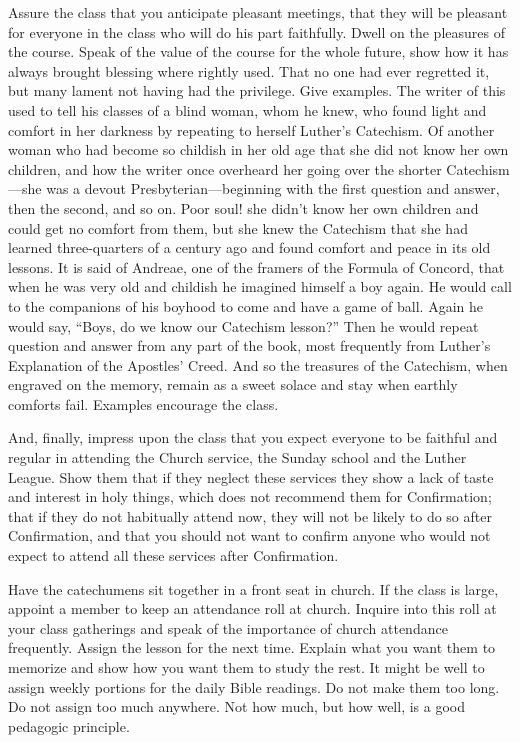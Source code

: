 Assure the class that you anticipate pleasant meetings, that they will be pleasant for everyone in the class who will do his part faithfully. Dwell on the
pleasures of the course. Speak of the value of the course for the whole future, show how it has always brought blessing where rightly used. That no one had ever regretted it, but many lament not having had the privilege. Give examples. The writer of this used to tell his classes of a blind woman, whom he knew, who found light and comfort in her darkness by repeating to herself Luther’s Catechism. Of another woman who had become so childish in her old age that she did not know her own children, and how the writer once overheard her going over the shorter Catechism—she was a devout Presbyterian—beginning with the first question and answer, then the second, and so on. Poor soul! she didn’t know her own children and could get no comfort from them, but she knew the Catechism that she had learned three-quarters of a century ago and found comfort and peace in its old lessons. It is said of Andreae, one of the framers of the Formula of Concord, that when he was very old and childish he imagined himself a boy again. He would call to the companions of his boyhood to come and have a game of ball. Again he would say, “Boys, do we know our Catechism lesson?” Then he would repeat question and answer from any part of the book, most frequently from Luther’s Explanation of the Apostles’ Creed. And so the treasures of the Catechism, when engraved on the memory, remain as a
sweet solace and stay when earthly comforts fail. Examples encourage the class.

And, finally, impress upon the class that you expect everyone to be faithful and regular in attending the Church service, the Sunday school and the Luther League. Show them that if they neglect these services they show a lack of taste and interest in holy things, which does not recommend them for Confirmation; that if they do not habitually attend now, they will not be likely to do so after Confirmation, and that you should not want to confirm anyone who would not expect to attend all these services after Confirmation.

Have the catechumens sit together in a front seat in church. If the class is large, appoint a member to keep an attendance roll at church. Inquire into this roll at your class gatherings and speak of the importance of church attendance frequently. Assign the lesson for the next time. Explain what you want them to memorize and show how you want them to study the rest. It might be well to assign weekly portions for the daily Bible readings. Do not make them too long. Do not assign too much anywhere. Not how much, but how well, is a good pedagogic principle.

